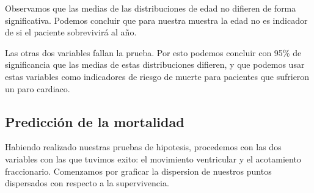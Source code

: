 \documentclass[11pt]{article}
\begin{document}
    Observamos que las medias de las distribuciones de edad no difieren de
forma significativa. Podemos concluir que para nuestra muestra la edad
no es indicador de si el paciente sobrevivirá al año.

Las otras dos variables fallan la prueba. Por esto podemos concluir con
95\% de significancia que las medias de estas distribuciones difieren, y
que podemos usar estas variables como indicadores de riesgo de muerte
para pacientes que sufrieron un paro cardiaco.

    \hypertarget{predicciuxf3n-de-la-mortalidad}{%
\subsection{Predicción de la
mortalidad}\label{predicciuxf3n-de-la-mortalidad}}

Habiendo realizado nuestras pruebas de hipotesis, procedemos con las dos
variables con las que tuvimos exito: el movimiento ventricular y el
acotamiento fraccionario. Comenzamos por graficar la dispersion de
nuestros puntos dispersados con respecto a la supervivencia.
\end{document}
